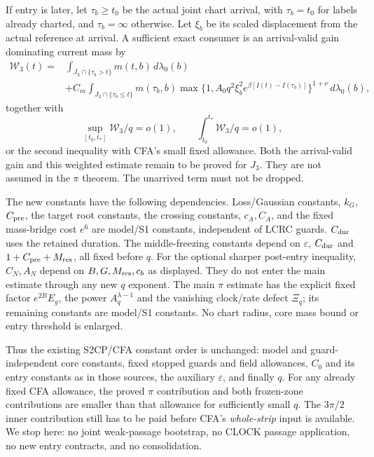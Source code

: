 \documentclass[11pt]{article}
\numberwithin{equation}{section}
\theoremstyle{remark}\newtheorem{remark}[theorem]{Remark}
\newcommand{\dd}{\,d}
\begin{document}
If entry is later, let $\tau_b\ge t_0$ be the actual joint chart
arrival, with $\tau_b=t_0$ for labels already charted, and
$\tau_b=\infty$ otherwise. Let $\xi_b$ be its scaled displacement
from the actual reference at arrival. A sufficient exact consumer
is an arrival-valid gain dominating current mass by
\begin{align}
 \mathcal W_3(t)={}&
 \int_{J_3\cap\{\tau_b>t\}}m(t,b)\dd\lambda_0(b)\nonumber\\
 &+C_m\int_{J_3\cap\{\tau_b\le t\}}m(\tau_b,b)
 \max\{1,A_0q^2\xi_b^2e^{\beta[I(t)-I(\tau_b)]}\}^{1+\nu}
                      \dd\lambda_0(b),             \label{an03pisbv1:lateconsumer}
\end{align}
together with
\[
 \sup_{[t_0,t_*]}\mathcal W_3/q=o(1),\qquad
 \int_{t_0}^{t_*}\mathcal W_3/q=o(1),
\]
or the second inequality with CFA's small fixed allowance.
Both the arrival-valid gain and this weighted estimate remain to
be proved for $J_3$. They are not assumed in the $\pi$ theorem.
The unarrived term must not be dropped.

The new constants have the following dependencies.
Loss/Gaussian constants, $k_G$, $C_{\rm pre}$, the target root
constants, the crossing constants, $c_A,C_A$, and the fixed
mass-bridge cost $e^6$ are model/S1 constants, independent of
LCRC guards. $C_{\rm dur}$ uses the retained duration.
The middle-freezing constants depend on $\varepsilon$,
$C_{\rm dur}$ and $1+C_{\rm pre}+M_{\rm res}$, all fixed before $q$.
For the optional sharper post-entry inequality,
$C_N,A_N$ depend on $B,G,M_{\rm res},c_b$ as displayed.
They do not enter the main estimate through any new $q$ exponent.
The main $\pi$ estimate has the explicit fixed factor $e^{2B}E_g$,
the power $A_q^{\lambda-1}$ and the vanishing clock/rate defect
$\Xi_q$; its remaining constants are model/S1 constants.
No chart radius, core mass bound or entry threshold is enlarged.

Thus the existing S2CP/CFA constant order is unchanged:
model and guard-independent core constants, fixed stopped guards
and field allowances, $C_0$ and its entry constants as in those
sources, the auxiliary $\varepsilon$, and finally $q$.
For any already fixed CFA allowance, the proved $\pi$ contribution
and both frozen-zone contributions are smaller than that allowance
for sufficiently small $q$. The $3\pi/2$ inner contribution still
has to be paid before CFA's \emph{whole-strip} input is available.
We stop here: no joint weak-passage bootstrap, no CLOCK passage
application, no new entry contracts, and no consolidation.
\end{document}
